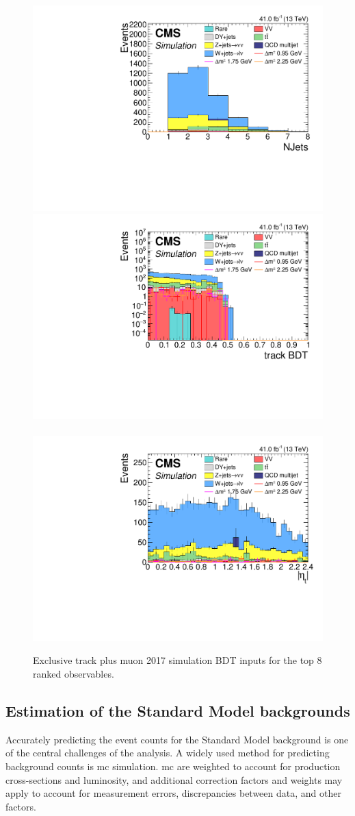 \begin{figure}[!htb]
\includegraphics[width=0.48\linewidth]{plots/track_muon_bg_signal/none_NJets.pdf} \\
\includegraphics[width=0.48\linewidth]{plots/track_muon_bg_signal/none_trackBDTCorrJetNoMultIso10Dr0.6_log.pdf} \,
\includegraphics[width=0.48\linewidth]{plots/track_muon_bg_signal/none_abs(trackCorrJetNoMultIso10Dr0.6.Eta()).pdf} \\



\caption[Exclusive track plus muon simulation BDT inputs]{Exclusive track plus muon 2017 simulation BDT inputs for the top 8 ranked observables.}
\label{fig:exclusive-track-muon-bdt-sim-inputs}
\end{figure}


\clearpage
\subsection{Estimation of the Standard Model backgrounds}
\label{sec:background-estimation}

Accurately predicting the event counts for the Standard Model background is one of the central challenges of the analysis. A widely used method for predicting background counts is \gls{mc} simulation. \gls{mc} are weighted to account for production cross-sections and luminosity, and additional correction factors and weights may apply to account for measurement errors, discrepancies between data, and other factors.


